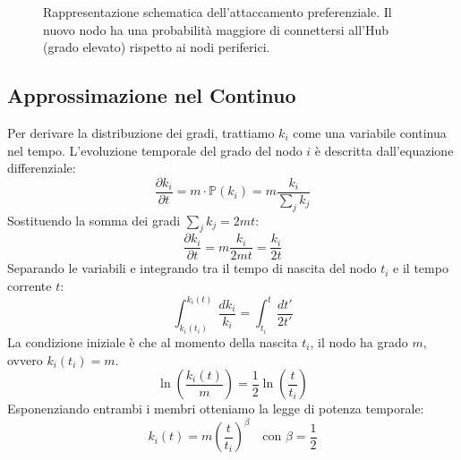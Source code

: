\begin{figure}[h]
    \centering
    \caption{Rappresentazione schematica dell'attaccamento preferenziale. Il nuovo nodo ha una probabilità maggiore di connettersi all'Hub (grado elevato) rispetto ai nodi periferici.}
\end{figure}

\subsection{Approssimazione nel Continuo}

Per derivare la distribuzione dei gradi, trattiamo $k_i$ come una variabile continua nel tempo. L'evoluzione temporale del grado del nodo $i$ è descritta dall'equazione differenziale:
\begin{equation}
    \frac{\partial k_i}{\partial t} = m \cdot \mathbb{P}(k_i) = m \frac{k_i}{\sum_j k_j}
\end{equation}
Sostituendo la somma dei gradi $\sum_j k_j = 2mt$:
\begin{equation}
    \frac{\partial k_i}{\partial t} = m \frac{k_i}{2mt} = \frac{k_i}{2t}
\end{equation}
Separando le variabili e integrando tra il tempo di nascita del nodo $t_i$ e il tempo corrente $t$:
\begin{equation}
    \int_{k_i(t_i)}^{k_i(t)} \frac{dk_i}{k_i} = \int_{t_i}^{t} \frac{dt'}{2t'}
\end{equation}
La condizione iniziale è che al momento della nascita $t_i$, il nodo ha grado $m$, ovvero $k_i(t_i) = m$.
\begin{equation}
    \ln\left(\frac{k_i(t)}{m}\right) = \frac{1}{2} \ln\left(\frac{t}{t_i}\right)
\end{equation}
Esponenziando entrambi i membri otteniamo la legge di potenza temporale:
\begin{equation}
    k_i(t) = m \left( \frac{t}{t_i} \right)^{\beta} \quad \text{con } \beta = \frac{1}{2}
\end{equation}

